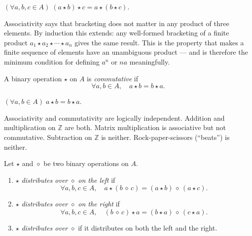 \begin{remark}
$(\forall a, b, c \in A)\;(a \star b) \star c = a \star (b \star c)$.
\end{remark}

\begin{remark}
Associativity says that bracketing does not matter in any product of three
elements.
By induction this extends: any well-formed bracketing of a finite product
$a_1 \star a_2 \star \cdots \star a_n$ gives the same result.
This is the property that makes a finite sequence of elements have an
unambiguous product — and is therefore the minimum condition for defining
$a^n$ or $na$ meaningfully.
\end{remark}

\begin{tcolorbox}[colback=propbox, colframe=propborder, arc=2pt,
  left=6pt, right=6pt, top=4pt, bottom=4pt,
  title={\small\textbf{Definition (Commutativity)}},
  fonttitle=\small\bfseries]
\label{def:commutativity}
A binary operation $\star$ on $A$ is \emph{commutative} if
\[
  \forall a, b \in A,\quad a \star b = b \star a.
\]
\end{tcolorbox}

\begin{remark}
$(\forall a, b \in A)\; a \star b = b \star a$.
\end{remark}

\begin{remark}
Associativity and commutativity are logically independent.
Addition and multiplication on $\mathbb{Z}$ are both.
Matrix multiplication is associative but not commutative.
Subtraction on $\mathbb{Z}$ is neither.
Rock-paper-scissors (``beats'') is neither.
\end{remark}

\begin{tcolorbox}[colback=propbox, colframe=propborder, arc=2pt,
  left=6pt, right=6pt, top=4pt, bottom=4pt,
  title={\small\textbf{Definition (Distributivity)}},
  fonttitle=\small\bfseries]
\label{def:distributivity}
Let $\star$ and $\diamond$ be two binary operations on $A$.
\begin{enumerate}[label=(\roman*)]
  \item $\star$ \emph{distributes over} $\diamond$ \emph{on the left} if
        \[
          \forall a, b, c \in A,\quad
          a \star (b \,\diamond\, c)
          = (a \star b) \,\diamond\, (a \star c).
        \]
  \item $\star$ \emph{distributes over} $\diamond$ \emph{on the right} if
        \[
          \forall a, b, c \in A,\quad
          (b \,\diamond\, c) \star a
          = (b \star a) \,\diamond\, (c \star a).
        \]
  \item $\star$ \emph{distributes over} $\diamond$ if it distributes on
        both the left and the right.
\end{enumerate}
\end{tcolorbox}

